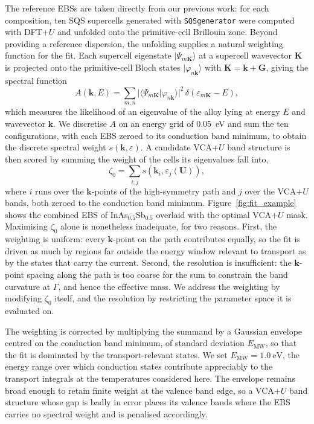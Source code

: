 \documentclass[aps,prmaterials,reprint,amsmath,amssymb,superscriptaddress]{revtex4-2}
\begin{document}
The reference EBSs are taken directly from our previous work\cite{Gentles2026a}: for each composition, ten SQS supercells generated with \texttt{SQSgenerator}\cite{sqsgen} were computed with DFT$+U$ and unfolded onto the primitive-cell Brillouin zone. Beyond providing a reference dispersion, the unfolding supplies a natural weighting function for the fit. Each supercell eigenstate $|\Psi_{m\bm{K}}\rangle$ at a supercell wavevector $\bm{K}$ is projected onto the primitive-cell Bloch states $|\varphi_{n\bm{k}}\rangle$ with $\bm{K}=\bm{k}+\bm{G}$, giving the spectral function
\begin{equation}
    A(\bm{k},E)=\sum_{m,n}\big|\langle\Psi_{m\bm{K}}|\varphi_{n\bm{k}}\rangle\big|^{2}\,
    \delta(\varepsilon_{m\bm{K}}-E),
\end{equation}
which measures the likelihood of an eigenvalue of the alloy lying at energy $E$ and wavevector $\bm{k}$. We discretise $A$ on an energy grid of \SI{0.05}{\electronvolt} and sum the ten configurations, with each EBS zeroed to its conduction band minimum, to obtain the discrete spectral weight $s(\bm{k},\varepsilon)$. A candidate VCA+$U$ band structure is then scored by summing the weight of the cells its eigenvalues fall into,
\begin{equation}
    \zeta_0 = \sum_{i,j} s(\bm{k}_i,\varepsilon_{j}(\bm{U})),
    \label{eq:loss_zeta0}
\end{equation}
where $i$ runs over the $\bm{k}$-points of the high-symmetry path and $j$ over the VCA$+U$ bands, both zeroed to the conduction band minimum. Figure~\ref{fig:fit_example} shows the combined EBS of InAs$_{0.5}$Sb$_{0.5}$ overlaid with the optimal VCA$+U$ mask. Maximising $\zeta_0$ alone is nonetheless inadequate, for two reasons. First, the weighting is uniform: every $\bm{k}$-point on the path contributes equally, so the fit is driven as much by regions far outside the energy window relevant to transport as by the states that carry the current. Second, the resolution is insufficient: the $\bm{k}$-point spacing along the path is too coarse for the sum to constrain the band curvature at $\Gamma$, and hence the effective mass. We address the weighting by modifying $\zeta_0$ itself, and the resolution by restricting the parameter space it is evaluated on.

The weighting is corrected by multiplying the summand by a Gaussian envelope centred on the conduction band minimum, of standard deviation $E_\text{MW}$, so that the fit is dominated by the transport-relevant states. We set $E_\text{MW}=\SI{1.0}{\electronvolt}$, the energy range over which conduction states contribute appreciably to the transport integrals at the temperatures considered here. The envelope remains broad enough to retain finite weight at the valence band edge, so a VCA$+U$ band structure whose gap is badly in error places its valence bands where the EBS carries no spectral weight and is penalised accordingly.
\end{document}
